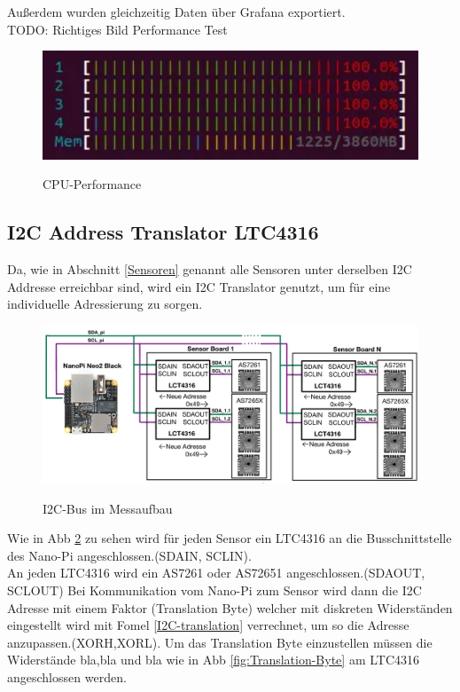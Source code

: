 Außerdem wurden gleichzeitig Daten über Grafana exportiert.\\
TODO: Richtiges Bild Performance Test\\
\begin{figure}[H]
  \centering
  \caption{CPU-Performance}
 \includegraphics[width=0.7\linewidth]{img/CPU-Performance.png}
  \label{fig:CPU-Performance}
\end{figure}

\subsection{I2C Address Translator LTC4316}\label{I2C-Translator}
Da, wie in Abschnitt \ref{Sensoren} genannt alle Sensoren unter derselben I2C Addresse erreichbar sind, wird ein I2C Translator genutzt, um für eine individuelle Adressierung zu sorgen.\\

\begin{figure}[H]
  \centering
  \caption{I2C-Bus im Messaufbau}
 \includegraphics[width=1\linewidth]{img/Adress-Translation}
  \label{fig:adress-translation}
\end{figure}
\noindent Wie in Abb \ref{fig:adress-translation} zu sehen wird für jeden Sensor ein LTC4316 an die Busschnittstelle des Nano-Pi angeschlossen.(SDAIN, SCLIN).\\ 
An jeden LTC4316 wird ein AS7261 oder AS72651 angeschlossen.(SDAOUT, SCLOUT)
Bei Kommunikation vom Nano-Pi zum Sensor wird dann die I2C Adresse mit einem Faktor (Translation Byte) welcher mit diskreten Widerständen eingestellt wird mit Fomel \ref{I2C-translation} verrechnet, um so die Adresse anzupassen.(XORH,XORL).
Um das Translation Byte einzustellen müssen die Widerstände bla,bla und bla wie in Abb \ref{fig:Translation-Byte} am LTC4316 angeschlossen werden.

